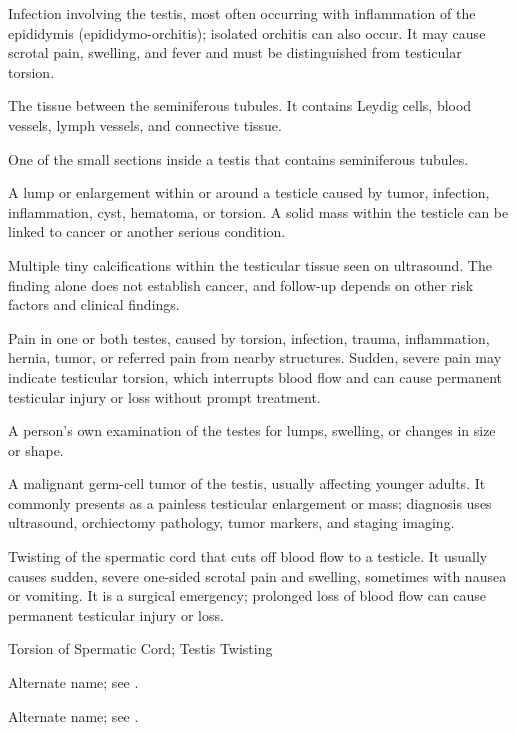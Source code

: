  Infection involving the testis, most often occurring with inflammation of the epididymis (epididymo-orchitis); isolated orchitis can also occur. It may cause scrotal pain, swelling, and fever and must be distinguished from testicular torsion.

 The tissue between the seminiferous tubules. It contains Leydig cells, blood vessels, lymph vessels, and connective tissue.

 One of the small sections inside a testis that contains seminiferous tubules.

 A lump or enlargement within or around a testicle caused by tumor, infection, inflammation, cyst, hematoma, or torsion. A solid mass within the testicle can be linked to cancer or another serious condition.

 Multiple tiny calcifications within the testicular tissue seen on ultrasound. The finding alone does not establish cancer, and follow-up depends on other risk factors and clinical findings.

 Pain in one or both testes, caused by torsion, infection, trauma, inflammation,
hernia, tumor, or referred pain from nearby structures. Sudden, severe pain may indicate testicular
torsion, which interrupts blood flow and can cause permanent testicular injury or loss without prompt
treatment.

 A person's own examination of the testes for lumps, swelling, or changes in size or shape.

 A malignant germ-cell tumor of the testis, usually affecting younger adults. It commonly presents as a painless testicular enlargement or mass; diagnosis uses ultrasound, orchiectomy pathology, tumor markers, and staging imaging.

 Twisting of the spermatic cord that cuts off blood flow to
a testicle. It usually causes sudden, severe one-sided scrotal pain and swelling, sometimes
with nausea or vomiting. It is a surgical emergency; prolonged loss of blood flow can cause
permanent testicular injury or loss.

\synonyms
Torsion of Spermatic Cord; Testis Twisting

 Alternate name; see .

 Alternate name; see .

